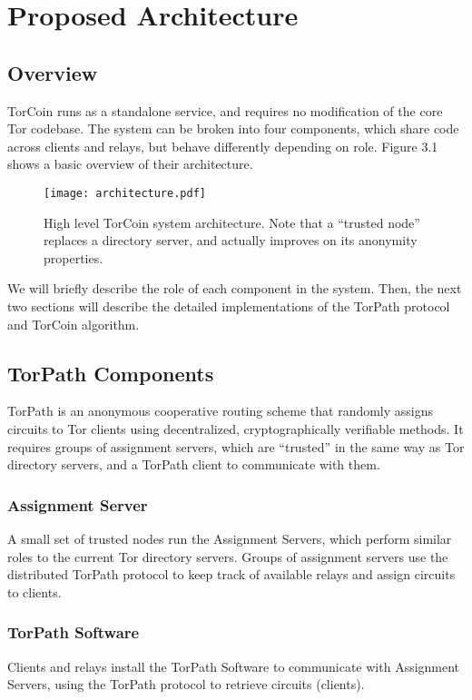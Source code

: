 \section{Proposed Architecture} \label{arch}

\subsection{Overview}

TorCoin runs as a standalone service, and requires no modification of the core
Tor codebase. The system can be broken into four components, which share code
across clients and relays, but behave differently depending on role. Figure 3.1
shows a basic overview of their architecture.

\begin{figure}
  \centering
    \texttt{[image: architecture.pdf]}
  \caption{High level TorCoin system architecture. Note that a ``trusted node''
  replaces a directory server, and actually improves on its anonymity properties.}
\end{figure}

We will briefly describe the role of each component in the system. Then, the
next two sections will describe the detailed implementations of the TorPath
protocol and TorCoin algorithm.

\subsection{TorPath Components} TorPath is an anonymous cooperative routing
scheme that randomly assigns circuits to Tor clients using decentralized,
cryptographically verifiable methods. It requires groups of assignment servers,
which are ``trusted'' in the same way as Tor directory servers, and a TorPath
client to communicate with them. 

\subsubsection{Assignment Server} A small set of trusted nodes run the
Assignment Servers, which perform similar roles to the current Tor directory 
servers. Groups of assignment servers use the distributed TorPath protocol to 
keep track of available relays and assign circuits to clients.

\subsubsection{TorPath Software} Clients and relays install the TorPath Software to
communicate with Assignment Servers, using the TorPath protocol to retrieve
circuits (clients). 


